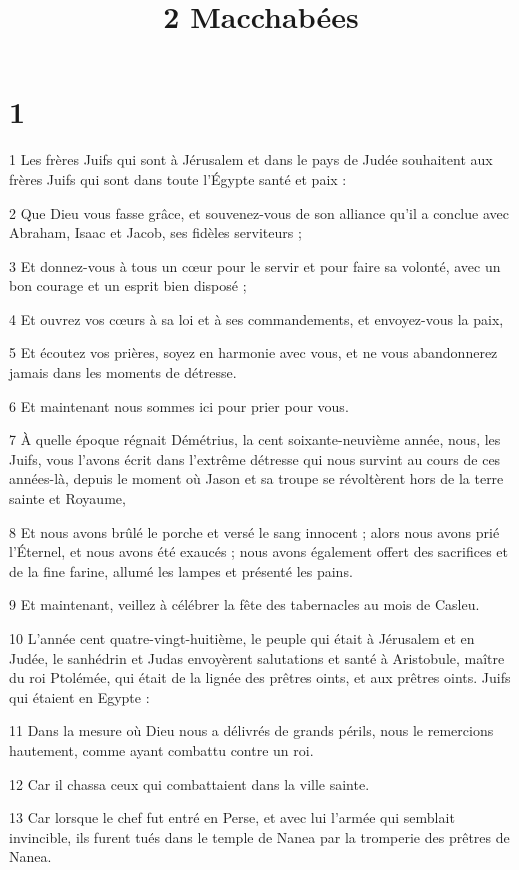 

\title{2 Macchabées}


\chapter{1}

\par 1 Les frères Juifs qui sont à Jérusalem et dans le pays de Judée souhaitent aux frères Juifs qui sont dans toute l'Égypte santé et paix :
\par 2 Que Dieu vous fasse grâce, et souvenez-vous de son alliance qu'il a conclue avec Abraham, Isaac et Jacob, ses fidèles serviteurs ;
\par 3 Et donnez-vous à tous un cœur pour le servir et pour faire sa volonté, avec un bon courage et un esprit bien disposé ;
\par 4 Et ouvrez vos cœurs à sa loi et à ses commandements, et envoyez-vous la paix,
\par 5 Et écoutez vos prières, soyez en harmonie avec vous, et ne vous abandonnerez jamais dans les moments de détresse.
\par 6 Et maintenant nous sommes ici pour prier pour vous.
\par 7 À quelle époque régnait Démétrius, la cent soixante-neuvième année, nous, les Juifs, vous l'avons écrit dans l'extrême détresse qui nous survint au cours de ces années-là, depuis le moment où Jason et sa troupe se révoltèrent hors de la terre sainte et Royaume,
\par 8 Et nous avons brûlé le porche et versé le sang innocent ; alors nous avons prié l'Éternel, et nous avons été exaucés ; nous avons également offert des sacrifices et de la fine farine, allumé les lampes et présenté les pains.
\par 9 Et maintenant, veillez à célébrer la fête des tabernacles au mois de Casleu.
\par 10 L'année cent quatre-vingt-huitième, le peuple qui était à Jérusalem et en Judée, le sanhédrin et Judas envoyèrent salutations et santé à Aristobule, maître du roi Ptolémée, qui était de la lignée des prêtres oints, et aux prêtres oints. Juifs qui étaient en Egypte :
\par 11 Dans la mesure où Dieu nous a délivrés de grands périls, nous le remercions hautement, comme ayant combattu contre un roi.
\par 12 Car il chassa ceux qui combattaient dans la ville sainte.
\par 13 Car lorsque le chef fut entré en Perse, et avec lui l'armée qui semblait invincible, ils furent tués dans le temple de Nanea par la tromperie des prêtres de Nanea.
